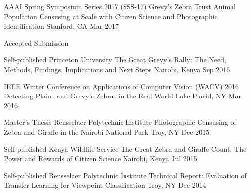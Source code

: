 

\begin{cventries}

  \cventry
    {AAAI Spring Symposium Series 2017 (SSS-17) \dotSep Grevy's Zebra Trust} %
    {Animal Population Censusing at Scale with Citizen Science and Photographic Identification} %
    {Stanford, CA} %
    {Mar 2017} %
    {
     \begin{cvitems}
        \item {Accepted Submission}
      \end{cvitems}
    }

  \cventryshort
    {Self-published \dotSep Princeton University} %
    {The Great Grevy’s Rally: The Need, Methods, Findings, Implications and Next Steps} %
    {Nairobi, Kenya} %
    {Sep 2016} %

  \cventryshort
    {IEEE Winter Conference on Applications of Computer Vision (WACV) 2016} %
    {Detecting Plains and Grevy's Zebras in the Real World} %
    {Lake Placid, NY} %
    {Mar 2016} %

  \cventryshort
    {Master's Thesis \dotSep Rensselaer Polytechnic Institute} %
    {Photographic Censusing of Zebra and Giraffe in the Nairobi National Park} %
    {Troy, NY} %
    {Dec 2015} %

  \cventryshort
    {Self-published \dotSep Kenya Wildlife Service} %
    {The Great Zebra and Giraffe Count: The Power and Rewards of Citizen Science} %
    {Nairobi, Kenya} %
    {Jul 2015} %

  \cventryshort
    {Self-published \dotSep Rensselaer Polytechnic Institute} %
    {Technical Report: Evaluation of Transfer Learning for Viewpoint Classification} %
    {Troy, NY} %
    {Dec 2014} %


\end{cventries}
